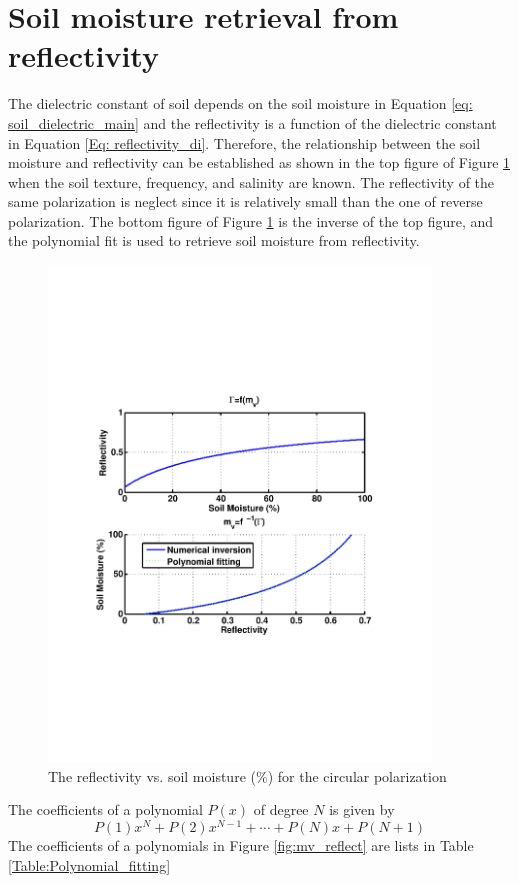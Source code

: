 \documentclass[draftcls,onecolumn]{IEEEtran}  %
\begin{document}
\section{Soil moisture retrieval from reflectivity}
The dielectric constant of soil depends on the soil moisture in Equation \ref{eq: soil_dielectric_main} and the reflectivity is a function of the dielectric constant in Equation \ref{Eq: reflectivity_di}. Therefore, the relationship between the soil moisture and reflectivity can be established as shown in the top figure of  Figure \ref{fig:reflect_mv} when the soil texture, frequency, and salinity are known. The reflectivity of the same polarization is neglect since it is relatively small than the one of reverse polarization. The bottom figure of Figure \ref{fig:reflect_mv} is the inverse of the top figure, and the polynomial fit is used to retrieve soil moisture from reflectivity.

\begin{figure}[t!]
	\centering
	\includegraphics[width=4in]{pdf/gamma_vs_mv1.pdf}
	\caption{The reflectivity vs. soil moisture ($\%$) for the circular polarization}
	\centering
	\label{fig:reflect_mv}
\end{figure}
 The coefficients of a polynomial $P(x)$ of degree $N$ is given by
 \begin{equation}
	P(1)x^N+P(2)x^{N-1}+\cdots+P(N)x+P(N+1)
\end{equation} The coefficients of a polynomials in Figure \ref{fig:mv_reflect} are lists in Table \ref{Table:Polynomial_fitting}
\end{document}
